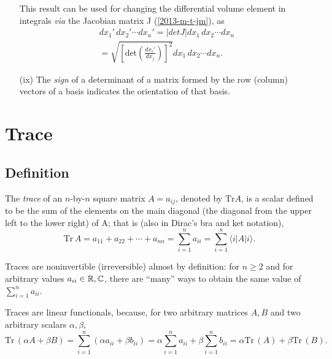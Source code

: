 \begin{itemize}
This result can be used for changing the differential volume element in integrals {\it via} the Jacobian matrix J
(\ref{2013-m-t-jm}), as
\begin{equation}
\begin{split}
dx_1'\, dx_2' \cdots dx_n'
= \vert det J \vert dx_1\, dx_2 \cdots dx_n     \\
= \sqrt{\left[\textrm{det}\left(\frac{dx_i'}{dx_j}\right)\right]^2} dx_1\, dx_2 \cdots dx_n
.
\end{split}
\end{equation}

\item[(ix)]
The {\em sign} of a  determinant of a matrix formed by the row (column)
 vectors of a basis indicates the {orientation}
of that basis.

\end{itemize}


\section{Trace}
\label{2013-ch-fdvs-trace}

\subsection{Definition}
The {\em trace} of an $n$-by-$n$ square matrix $A=a_{ij}$, denoted by
$\textrm{Tr} A$,  is a scalar
defined to be the sum of the elements on the main diagonal
 (the diagonal from the upper left to the lower right) of A; that is  (also in Dirac's bra and ket notation),
\begin{equation}
\textrm{Tr}\,A
= a_{11} +a_{22}+ \cdots +a_{nn}
=\sum_{i=1}^n a_{ii}=\sum_{i=1}^n \langle i \vert A\vert i \rangle.
\end{equation}

Traces are noninvertible (irreversible) almost by definition: for $n\ge 2$ and for arbitrary values $a_{ii} \in {\Bbb R}, {\Bbb C}$, there are
``many''  ways to obtain the same value of $ \sum_{i=1}^n a_{ii} $.

Traces are linear functionals, because, for two arbitrary matrices $A,B$
and two arbitrary scalars $\alpha, \beta$,
\begin{equation}
\textrm{Tr}\,(\alpha A + \beta B)
=\sum_{i=1}^n (\alpha a_{ii} + \beta b_{ii})
= \alpha \sum_{i=1}^n a_{ii} + \beta \sum_{i=1}^n  b_{ii}
=
\alpha \textrm{Tr}\,(A)+ \beta \textrm{Tr}\,(B)
.
\end{equation}

